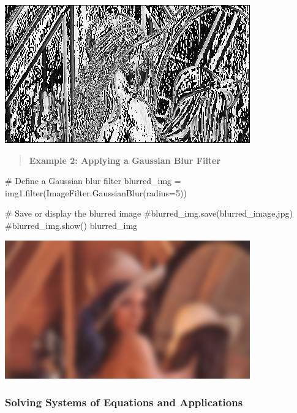 \documentclass[
  letterpaper,
  DIV=11,
  numbers=noendperiod]{scrreprt}
\newenvironment{Shaded}{\begin{snugshade}}{\end{snugshade}}
\newcommand{\BuiltInTok}[1]{\textcolor[rgb]{0.00,0.23,0.31}{#1}}
\newcommand{\CommentTok}[1]{\textcolor[rgb]{0.37,0.37,0.37}{#1}}
\newcommand{\DecValTok}[1]{\textcolor[rgb]{0.68,0.00,0.00}{#1}}
\newcommand{\NormalTok}[1]{\textcolor[rgb]{0.00,0.23,0.31}{#1}}
\newcommand{\OperatorTok}[1]{\textcolor[rgb]{0.37,0.37,0.37}{#1}}
\theoremstyle{plain}
\theoremstyle{definition}
\theoremstyle{remark}
\begin{document}
\includegraphics{module_1_files/figure-pdf/cell-14-output-1.png}

\begin{quote}
\textbf{Example 2: Applying a Gaussian Blur Filter}
\end{quote}

\begin{Shaded}
\begin{Highlighting}[]
\CommentTok{\# Define a Gaussian blur filter}
\NormalTok{blurred\_img }\OperatorTok{=}\NormalTok{ img1.}\BuiltInTok{filter}\NormalTok{(ImageFilter.GaussianBlur(radius}\OperatorTok{=}\DecValTok{5}\NormalTok{))}

\CommentTok{\# Save or display the blurred image}
\CommentTok{\#blurred\_img.save(\textquotesingle{}blurred\_image.jpg\textquotesingle{})}
\CommentTok{\#blurred\_img.show()}
\NormalTok{blurred\_img}
\end{Highlighting}
\end{Shaded}

\includegraphics{module_1_files/figure-pdf/cell-15-output-1.png}

\subsubsection{Solving Systems of Equations and
Applications}\label{solving-systems-of-equations-and-applications}
\end{document}
